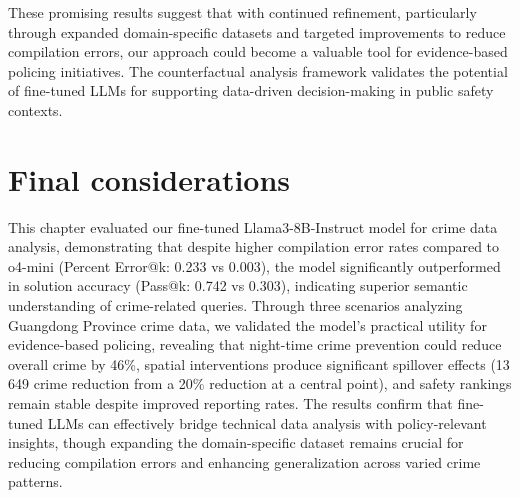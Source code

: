 These promising results suggest that with continued refinement, particularly through expanded domain-specific datasets and targeted improvements to reduce compilation errors, our approach could become a valuable tool for evidence-based policing initiatives. The counterfactual analysis framework validates the potential of fine-tuned LLMs for supporting data-driven decision-making in public safety contexts.


\section{Final considerations}

This chapter evaluated our fine-tuned Llama3-8B-Instruct model for crime data analysis, demonstrating that despite higher compilation error rates compared to o4-mini (Percent Error@k: 0.233 vs 0.003), the model significantly outperformed in solution accuracy (Pass@k: 0.742 vs 0.303), indicating superior semantic understanding of crime-related queries. Through three scenarios analyzing Guangdong Province crime data, we validated the model's practical utility for evidence-based policing, revealing that night-time crime prevention could reduce overall crime by 46\%, spatial interventions produce significant spillover effects (13 649 crime reduction from a 20\% reduction at a central point), and safety rankings remain stable despite improved reporting rates. The results confirm that fine-tuned LLMs can effectively bridge technical data analysis with policy-relevant insights, though expanding the domain-specific dataset remains crucial for reducing compilation errors and enhancing generalization across varied crime patterns.

